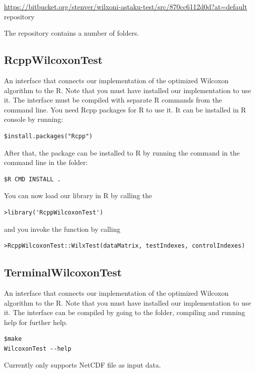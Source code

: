 \documentclass[12pt]{article}
\begin{document}
\url{https://bitbucket.org/stenver/wilxoni-astaku-test/src/870cc6112d0d?at=default} repository

The repository contains a number of folders.

\subsection{RcppWilcoxonTest}
 An interface that connects our implementation of the optimized Wilcoxon algorithm to the R. Note that you must have installed our implementation to use it. The interface must be compiled with separate R commands from the command line. You need Rcpp packages for R to use it. It can be installed in R console by running:

\begin{lstlisting}
$install.packages("Rcpp")
\end{lstlisting}

After that, the package can be installed to R by running the command in the command line in the folder:

\begin{lstlisting}
$R CMD INSTALL .
\end{lstlisting}

You can now load our library in R by calling the

\begin{lstlisting}
>library('RcppWilcoxonTest')
\end{lstlisting}

and you invoke the function by calling

\begin{lstlisting}
>RcppWilcoxonTest::WilxTest(dataMatrix, testIndexes, controlIndexes)
\end{lstlisting}

\subsection{TerminalWilcoxonTest}

An interface that connects our implementation of the optimized Wilcoxon algorithm to the R. Note that you must have installed our implementation to use it. The interface can be compiled by going to the folder, compiling and running help for further help.

\begin{lstlisting}
$make
WilcoxonTest --help
\end{lstlisting}

Currently only supports NetCDF file as input data.
\end{document}
